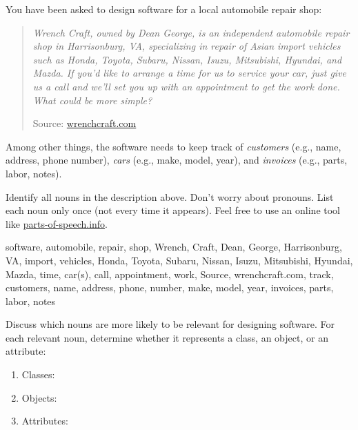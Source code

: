 
You have been asked to design software for a local automobile repair shop:

\begin{quote}
\slshape
Wrench Craft, owned by Dean George, is an independent automobile repair shop in Harrisonburg, VA, specializing in repair of Asian import vehicles such as Honda, Toyota, Subaru, Nissan, Isuzu, Mitsubishi, Hyundai, and Mazda. If you'd like to arrange a time for us to service your car, just give us a call and we'll set you up with an appointment to get the work done. What could be more simple?

\normalfont
Source: \href{http://www.wrenchcraft.com/}{wrenchcraft.com}
\end{quote}

Among other things, the software needs to keep track of \emph{customers} (e.g., name, address, phone number), \emph{cars} (e.g., make, model, year), and \emph{invoices} (e.g., parts, labor, notes).



\Q Identify all nouns in the description above.
Don't worry about pronouns.
List each noun only once (not every time it appears).
Feel free to use an online tool like \href{https://parts-of-speech.info/}{parts-of-speech.info}.

\begin{answer}[6em]
software, automobile, repair, shop, Wrench, Craft, Dean, George, Harrisonburg, VA, import, vehicles, Honda, Toyota, Subaru, Nissan, Isuzu, Mitsubishi, Hyundai, Mazda, time, car(s), call, appointment, work, Source, wrenchcraft.com, track, customers, name, address, phone, number, make, model, year, invoices, parts, labor, notes
\end{answer}


\Q \label{relevant}
Discuss which nouns are more likely to be relevant for designing software.
For each relevant noun, determine whether it represents a class, an object, or an attribute:

\begin{enumerate}[itemsep=0ex]

\item Classes: \hfill
{}

\item Objects: \hfill
{}

\item Attributes: \hfill
{}

\end{enumerate}


